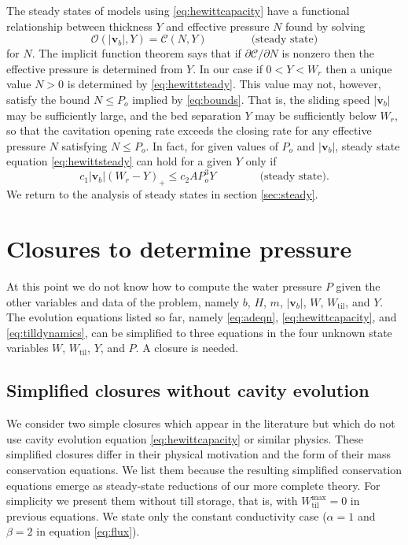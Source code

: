 \documentclass[gmd]{copernicus}   %
\newcommand{\text}{\textrm}
\newcommand\bv{\mathbf{v}}
\newcommand{\Wtil}{W_{\text{til}}}
\newcommand{\Wtilmax}{W_{\text{til}}^{\text{max}}}
\begin{document}
The steady states of models using \eqref{eq:hewittcapacity} have a functional relationship between thickness $Y$ and effective pressure $N$ found by solving
\begin{equation}
\mathcal{O}(|\bv_b|,Y) = \mathcal{C}(N,Y) \qquad \qquad \text{(steady state)} \label{eq:hewittsteady}
\end{equation}
for $N$.  The implicit function theorem says that if $\partial\mathcal{C}/\partial N$ is nonzero then the effective pressure is determined from $Y$.  In our case if $0<Y<W_r$ then a unique value $N>0$ is determined by \eqref{eq:hewittsteady}.  This value may not, however, satisfy the bound $N \le P_o$ implied by \eqref{eq:bounds}.  That is, the sliding speed $|\bv_b|$ may be sufficiently large, and the bed separation $Y$ may be sufficiently below $W_r$, so that the cavitation opening rate exceeds the closing rate for any effective pressure $N$ satisfying $N\le P_o$.  In fact, for given values of $P_o$ and $|\bv_b|$, steady state equation \eqref{eq:hewittsteady} can hold for a given $Y$ only if
\begin{equation}
c_1 |\bv_b| (W_r - Y)_+ \le c_2 A P_o^3 Y \qquad \qquad \text{(steady state)}. \label{eq:steadyOCbound}
\end{equation}
We return to the analysis of steady states in section \ref{sec:steady}.


\section{Closures to determine pressure} \label{sec:closures}

At this point we do not know how to compute the water pressure $P$ given the other variables and data of the problem, namely $b$, $H$, $m$, $|\bv_b|$, $W$, $\Wtil$, and $Y$.  The evolution equations listed so far, namely \eqref{eq:adeqn}, \eqref{eq:hewittcapacity}, and \eqref{eq:tilldynamics}, can be simplified to three equations in the four unknown state variables $W$, $\Wtil$, $Y$, and $P$.   A closure is needed.

\subsection{Simplified closures without cavity evolution}  We consider two simple closures which appear in the literature but which do not use cavity evolution equation \eqref{eq:hewittcapacity} or similar physics.  These simplified closures differ in their physical motivation and the form of their mass conservation equations.  We list them because the resulting simplified conservation equations emerge as steady-state reductions of our more complete theory.  For simplicity we present them without till storage, that is, with $\Wtilmax=0$ in previous equations.  We state only the constant conductivity case ($\alpha=1$ and $\beta=2$ in equation \eqref{eq:flux}).
\end{document}
